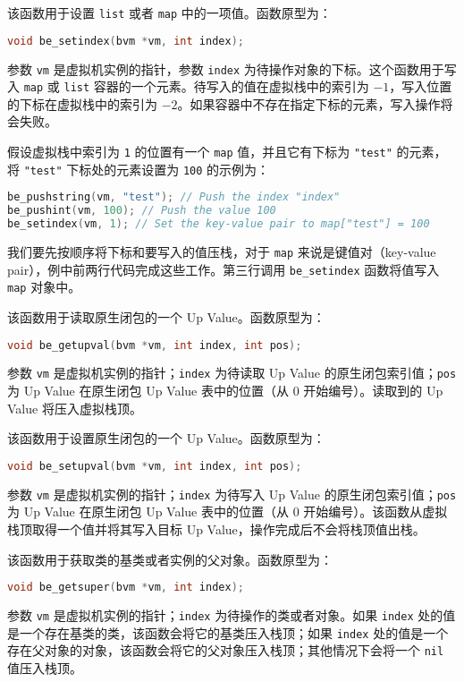 
该函数用于设置 \texttt{list} 或者 \texttt{map} 中的一项值。函数原型为：
\begin{lstlisting}[language=c, style=berry, numbers=none]
void be_setindex(bvm *vm, int index);
\end{lstlisting}
参数 \texttt{vm} 是虚拟机实例的指针，参数 \texttt{index} 为待操作对象的下标。这个函数用于写入 \texttt{map} 或 \texttt{list} 容器的一个元素。待写入的值在虚拟栈中的索引为 $-1$，写入位置的下标在虚拟栈中的索引为 $-2$。如果容器中不存在指定下标的元素，写入操作将会失败。

假设虚拟栈中索引为 \texttt{1} 的位置有一个 \texttt{map} 值，并且它有下标为 \texttt{"test"} 的元素，将 \texttt{"test"} 下标处的元素设置为 \texttt{100} 的示例为：
\begin{lstlisting}[language=c, style=berry]
be_pushstring(vm, "test"); // Push the index "index"
be_pushint(vm, 100); // Push the value 100
be_setindex(vm, 1); // Set the key-value pair to map["test"] = 100
\end{lstlisting}
我们要先按顺序将下标和要写入的值压栈，对于 \texttt{map} 来说是键值对（key-value pair），例中前两行代码完成这些工作。第三行调用 \texttt{be\_setindex} 函数将值写入 \texttt{map} 对象中。


该函数用于读取原生闭包的一个 Up Value。函数原型为：
\begin{lstlisting}[language=c, style=berry, numbers=none]
void be_getupval(bvm *vm, int index, int pos);
\end{lstlisting}
参数 \texttt{vm} 是虚拟机实例的指针；\texttt{index} 为待读取 Up Value 的原生闭包索引值；\texttt{pos} 为 Up Value 在原生闭包 Up Value 表中的位置（从 0 开始编号）。读取到的 Up Value 将压入虚拟栈顶。


该函数用于设置原生闭包的一个 Up Value。函数原型为：
\begin{lstlisting}[language=c, style=berry, numbers=none]
void be_setupval(bvm *vm, int index, int pos);
\end{lstlisting}
参数 \texttt{vm} 是虚拟机实例的指针；\texttt{index} 为待写入 Up Value 的原生闭包索引值；\texttt{pos} 为 Up Value 在原生闭包 Up Value 表中的位置（从 0 开始编号）。该函数从虚拟栈顶取得一个值并将其写入目标 Up Value，操作完成后不会将栈顶值出栈。


该函数用于获取类的基类或者实例的父对象。函数原型为：
\begin{lstlisting}[language=c, style=berry, numbers=none]
void be_getsuper(bvm *vm, int index);
\end{lstlisting}
参数 \texttt{vm} 是虚拟机实例的指针；\texttt{index} 为待操作的类或者对象。如果 \texttt{index} 处的值是一个存在基类的类，该函数会将它的基类压入栈顶；如果 \texttt{index} 处的值是一个存在父对象的对象，该函数会将它的父对象压入栈顶；其他情况下会将一个 \texttt{nil} 值压入栈顶。


